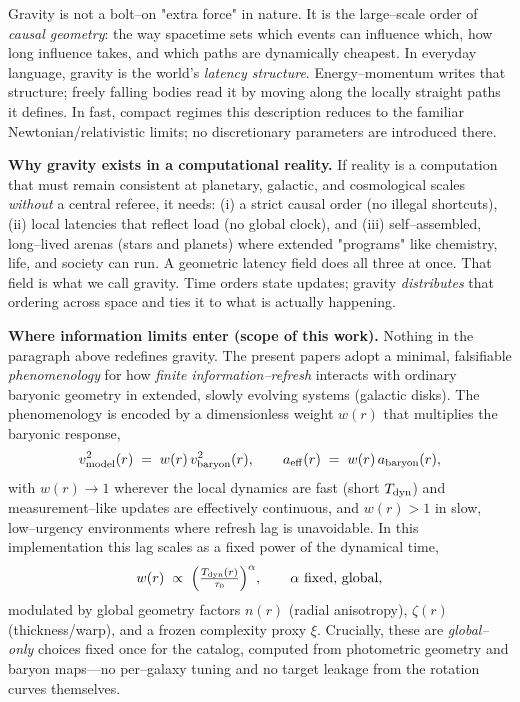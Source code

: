 \documentclass[usenatbib]{mnras}
\begin{document}
Gravity is not a bolt–on "extra force" in nature. It is the large–scale order of \emph{causal geometry}: the way spacetime sets which events can influence which, how long influence takes, and which paths are dynamically cheapest. In everyday language, gravity is the world's \emph{latency structure}. Energy–momentum writes that structure; freely falling bodies read it by moving along the locally straight paths it defines. In fast, compact regimes this description reduces to the familiar Newtonian/relativistic limits; no discretionary parameters are introduced there.

\vspace{0.5em}
\noindent\textbf{Why gravity exists in a computational reality.}
If reality is a computation that must remain consistent at planetary, galactic, and cosmological scales \emph{without} a central referee, it needs:
(i) a strict causal order (no illegal shortcuts),
(ii) local latencies that reflect load (no global clock),
and (iii) self–assembled, long–lived arenas (stars and planets) where extended "programs" like chemistry, life, and society can run.
A geometric latency field does all three at once. That field is what we call gravity.
Time orders state updates; gravity \emph{distributes} that ordering across space and ties it to what is actually happening.

\vspace{0.5em}
\noindent\textbf{Where information limits enter (scope of this work).}
Nothing in the paragraph above redefines gravity. The present papers adopt a minimal, falsifiable \emph{phenomenology} for how \emph{finite information–refresh} interacts with ordinary baryonic geometry in extended, slowly evolving systems (galactic disks). The phenomenology is encoded by a dimensionless weight \(w(r)\) that multiplies the baryonic response,
\[
v_{\rm model}^2(r) \;=\; w(r)\,v_{\rm baryon}^2(r),
\qquad
a_{\rm eff}(r) \;=\; w(r)\,a_{\rm baryon}(r),
\]
with \(w(r)\to 1\) wherever the local dynamics are fast (short \(T_{\rm dyn}\)) and measurement–like updates are effectively continuous, and \(w(r)>1\) in slow, low–urgency environments where refresh lag is unavoidable. In this implementation this lag scales as a fixed power of the dynamical time,
\[
w(r)\;\propto\;\Big(\tfrac{T_{\rm dyn}(r)}{\tau_0}\Big)^{\alpha},
\qquad \alpha \text{ fixed, global},
\]
modulated by global geometry factors \(n(r)\) (radial anisotropy), \(\zeta(r)\) (thickness/warp), and a frozen complexity proxy \(\xi\).
Crucially, these are \emph{global–only} choices fixed once for the catalog, computed from photometric geometry and baryon maps—no per–galaxy tuning and no target leakage from the rotation curves themselves.
\end{document}
